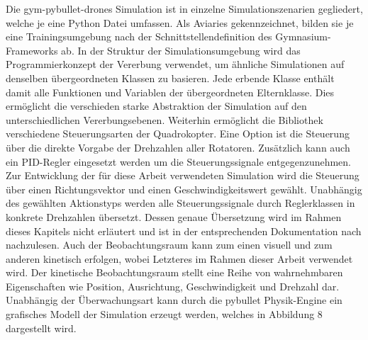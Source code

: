 Die gym-pybullet-drones Simulation ist in einzelne Simulationszenarien gegliedert, welche je eine Python Datei umfassen.
Als Aviaries gekennzeichnet, bilden sie je eine Trainingsumgebung nach der Schnittstellendefinition des Gymnasium-Frameworks ab.
In der Struktur der Simulationsumgebung wird das Programmierkonzept der Vererbung verwendet, um ähnliche Simulationen auf denselben übergeordneten Klassen zu basieren.
Jede erbende Klasse enthält damit alle Funktionen und Variablen der übergeordneten Elternklasse.
Dies ermöglicht die verschieden starke Abstraktion der Simulation auf den unterschiedlichen Vererbungsebenen.
Weiterhin ermöglicht die Bibliothek verschiedene Steuerungsarten der Quadrokopter. 
Eine Option ist die Steuerung über die direkte Vorgabe der Drehzahlen aller Rotatoren. 
Zusätzlich kann auch ein PID-Regler eingesetzt werden um die Steuerungssignale entgegenzunehmen.
Zur Entwicklung der für diese Arbeit verwendeten Simulation wird die Steuerung über einen Richtungsvektor und einen Geschwindigkeitswert gewählt.
Unabhängig des gewählten Aktionstyps werden alle Steuerungssignale durch Reglerklassen in konkrete Drehzahlen übersetzt.
Dessen genaue Übersetzung wird im Rahmen dieses Kapitels nicht erläutert und ist in der entsprechenden Dokumentation nach \cite[]{Panerati.332021} nachzulesen.
Auch der Beobachtungsraum kann zum einen visuell und zum anderen kinetisch erfolgen, wobei Letzteres im Rahmen dieser Arbeit verwendet wird.
Der kinetische Beobachtungsraum stellt eine Reihe von wahrnehmbaren Eigenschaften wie Position, Ausrichtung, Geschwindigkeit und Drehzahl dar.
Unabhängig der Überwachungsart kann durch die pybullet Physik-Engine ein grafisches Modell der Simulation erzeugt werden, welches in Abbildung 8 dargestellt wird.

